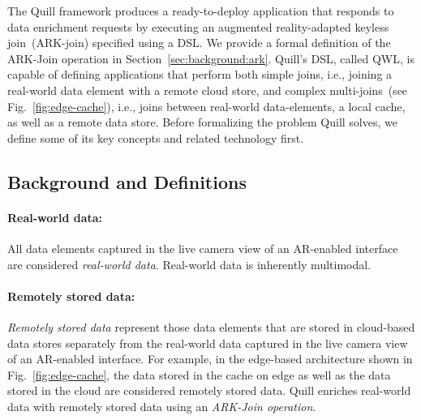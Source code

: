\documentclass[11pt]{article}
\begin{document}
The Quill framework produces a ready-to-deploy application that responds to data enrichment requests by executing an augmented reality-adapted keyless join~(ARK-join) specified using a DSL. We provide a formal definition of the ARK-Join operation in Section~\ref{sec:background:ark}. Quill's DSL, called QWL, is capable of defining applications that perform both simple joins, i.e., joining a real-world data element with a remote cloud store, and complex multi-joins~(see Fig.~\ref{fig:edge-cache}), i.e., joins between real-world data-elements, a local cache,  as well as a remote data store. Before formalizing the problem Quill solves, we define some of its key concepts and related technology first.

\subsection{Background and Definitions}
\label{sec:background}

\paragraph{Real-world data:}
\label{sec:background:real-world}
All data elements captured in the live camera view of an AR-enabled interface are considered \textit{real-world data}. Real-world data is inherently multimodal.\vspace{0.05cm}

\paragraph{Remotely stored data:}
\label{sec:background:remote}
\textit{Remotely stored data} represent those data elements that are stored in cloud-based data stores separately from the real-world data captured in the live camera view of an AR-enabled interface. For example, in the edge-based architecture shown in Fig.~\ref{fig:edge-cache}, the data stored in the cache on edge as well as the data stored in the cloud are considered remotely stored data. Quill enriches real-world data with remotely stored data using an \textit{ARK-Join operation}.\vspace{0.05cm}
\end{document}
